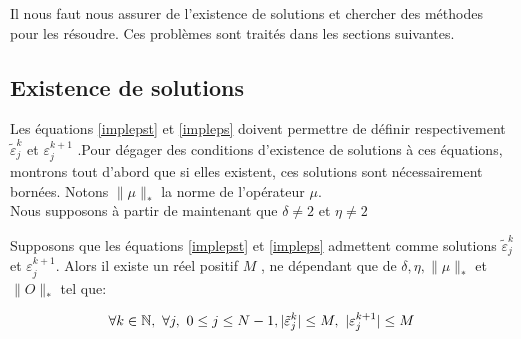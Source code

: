 \begin{itemize}
\begin{enumerate}
	\end{enumerate}
	
\end{itemize}
Il nous faut nous assurer de l'existence de solutions et chercher des méthodes pour les résoudre. Ces problèmes sont traités dans les sections suivantes.

\subsection{Existence de solutions}
Les équations \eqref{implepst} et \eqref{impleps} doivent permettre de définir respectivement $ \tilde{\varepsilon}_j^k $ et $ \varepsilon_j^{k+1} $ .Pour dégager des conditions d'existence de solutions à ces équations, montrons tout d'abord que si elles existent, ces solutions sont nécessairement bornées. Notons $ \lVert \mu \rVert_* $ la norme de l'opérateur $\mu$.\\

Nous supposons à partir de maintenant que $\delta \neq 2$ et $\eta \neq 2$

\begin{theorem} \label{theoborne}
	Supposons que les équations \eqref{implepst} et \eqref{impleps} admettent comme solutions $ \tilde{\varepsilon}_j^k $ et $ \varepsilon_j^{k+1} $. Alors il existe un réel positif $M$ , ne dépendant que de $\delta,\eta,\lVert \mu \rVert_*$ et $\lVert O \rVert_*$ tel que:
	
	$$ \forall k \in \mathbb N,\  \forall j,\  0 \leq j \leq N-1, |\tilde{\varepsilon}_j^k|\leq M,\ |\varepsilon_j^{k+1}| \leq M$$
	
\end{theorem}

